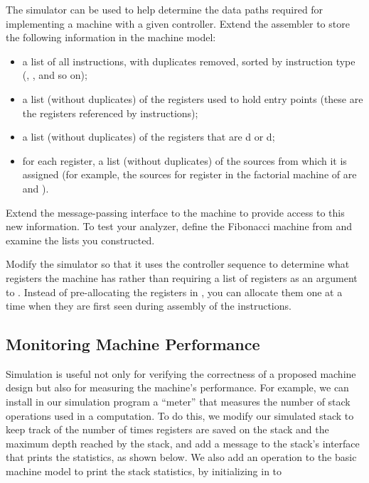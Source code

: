 \begin{exerciseGroup}
\begin{enumerate}[a.]
\end{enumerate}

\label{Exercise 5.12}
 The simulator can be used to help
determine the data paths required for implementing a machine with a given
controller.  Extend the assembler to store the following information in the
machine model:

\begin{itemize}
\item
a list of all instructions, with duplicates removed, sorted by instruction type
(, , and so on);

\item
a list (without duplicates) of the registers used to hold entry points (these
are the registers referenced by  instructions);

\item
a list (without duplicates) of the registers that are d
or d;

\item
for each register, a list (without duplicates) of the sources from which it is
assigned (for example, the sources for register  in the factorial
machine of  are  and ).
\end{itemize}

Extend the message-passing interface to the machine to provide access to this
new information.  To test your analyzer, define the Fibonacci machine from
 and examine the lists you constructed.

\label{Exercise 5.13}
 Modify the simulator so that it
uses the controller sequence to determine what registers the machine has rather
than requiring a list of registers as an argument to .
Instead of pre-allocating the registers in , you can
allocate them one at a time when they are first seen during assembly of the
instructions.
\end{exerciseGroup}

\subsection{Monitoring Machine Performance}
\label{Section 5.2.4}

Simulation is useful not only for verifying the correctness of a proposed
machine design but also for measuring the machine's performance.  For example,
we can install in our simulation program a ``meter'' that measures the number
of stack operations used in a computation.  To do this, we modify our simulated
stack to keep track of the number of times registers are saved on the stack and
the maximum depth reached by the stack, and add a message to the stack's
interface that prints the statistics, as shown below.  We also add an operation
to the basic machine model to print the stack statistics, by initializing
 in  to


